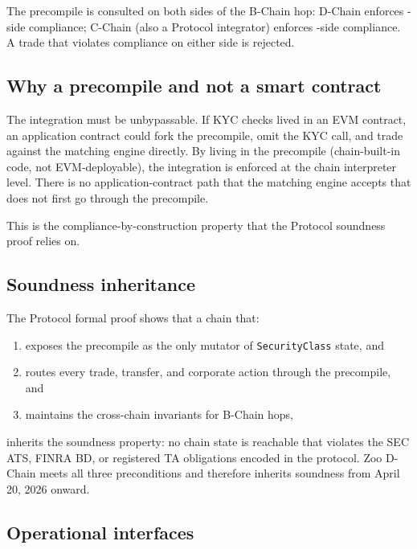 The \Liquidity{} precompile is consulted on both sides of the
B-Chain hop: \Zoo{} D-Chain enforces \Zoo{}-side compliance; \Lux{}
C-Chain (also a \Liquidity{} Protocol integrator) enforces \Lux{}-side
compliance. A trade that violates compliance on either side is
rejected.

\subsection{Why a precompile and not a smart contract}

The \Liquidity{} integration must be unbypassable. If KYC checks
lived in an EVM contract, an application contract could fork the
precompile, omit the KYC call, and trade against the matching engine
directly. By living in the precompile (chain-built-in code, not
EVM-deployable), the \Liquidity{} integration is enforced at the
chain interpreter level. There is no application-contract path that
the matching engine accepts that does not first go through the
precompile.

This is the compliance-by-construction property that the \Liquidity{}
Protocol soundness proof relies on.

\subsection{Soundness inheritance}

The \Liquidity{} Protocol formal proof \cite{liquidity-protocol-formal}
shows that a chain that:

\begin{enumerate}[leftmargin=1.4em]
  \item exposes the \Liquidity{} precompile as the only mutator of
        \texttt{SecurityClass} state, and
  \item routes every trade, transfer, and corporate action through
        the precompile, and
  \item maintains the cross-chain invariants for B-Chain hops,
\end{enumerate}

inherits the soundness property: no chain state is reachable that
violates the SEC ATS, FINRA BD, or registered TA obligations
encoded in the protocol. Zoo D-Chain meets all three preconditions
and therefore inherits soundness from April 20, 2026 onward.

\subsection{Operational interfaces}

